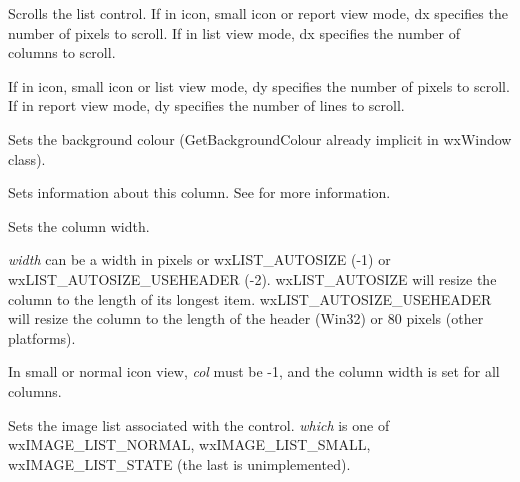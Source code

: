 \label{wxlistctrlscrolllist}


Scrolls the list control. If in icon, small icon or report view mode,
dx specifies the number of pixels to scroll. If in list view mode, dx
specifies the number of columns to scroll.

If in icon, small icon or list view mode, dy specifies the number of pixels
to scroll. If in report view mode, dy specifies the number of lines to scroll.

\label{wxlistctrlsetbackgroundcolour}


Sets the background colour (GetBackgroundColour already implicit in
wxWindow class).

\label{wxlistctrlsetcolumn}


Sets information about this column. See  for more
information.

\label{wxlistctrlsetcolumnwidth}


Sets the column width.

{\it width} can be a width in pixels or wxLIST\_AUTOSIZE (-1) or wxLIST\_AUTOSIZE\_USEHEADER (-2).
wxLIST\_AUTOSIZE will resize the column to the length of its longest item. wxLIST\_AUTOSIZE\_USEHEADER
will resize the column to the length of the header (Win32) or 80 pixels (other platforms).

In small or normal icon view, {\it col} must be -1, and the column width is set for all columns.

\label{wxlistctrlsetimagelist}


Sets the image list associated with the control. {\it which} is one of
wxIMAGE\_LIST\_NORMAL, wxIMAGE\_LIST\_SMALL, wxIMAGE\_LIST\_STATE (the last is unimplemented).

\label{wxlistctrlsetitem}

